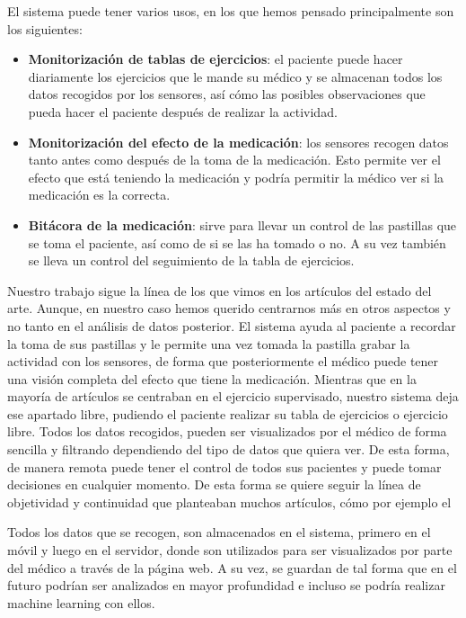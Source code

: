 \documentclass[11pt,spanish]{article}
\begin{document}
El sistema puede tener varios usos, en los que hemos pensado principalmente son los siguientes:

\begin{itemize}
	\item {\bf Monitorización de tablas de ejercicios}: el paciente puede hacer diariamente los ejercicios que le mande su médico y se almacenan todos los datos recogidos por los sensores, así cómo las posibles observaciones que pueda hacer el paciente después de realizar la actividad.
    \item {\bf Monitorización del efecto de la medicación}: los sensores recogen datos tanto antes como después de la toma de la medicación. Esto permite ver el efecto que está teniendo la medicación y podría permitir la médico ver si la medicación es la correcta.
    \item {\bf Bitácora de la medicación}: sirve para llevar un control de las pastillas que se toma el paciente, así como de si se las ha tomado o no. A su vez también se lleva un control del seguimiento de la tabla de ejercicios.
\end{itemize}

Nuestro trabajo sigue la línea de los que vimos en los artículos del estado del arte. Aunque, en nuestro caso hemos querido centrarnos más en otros aspectos y no tanto en el análisis de datos posterior. El sistema ayuda al paciente a recordar la toma de sus pastillas y le permite una vez tomada la pastilla grabar la actividad con los sensores, de forma que posteriormente el médico puede tener una visión completa del efecto que tiene la medicación. Mientras que en la mayoría de artículos se centraban en el ejercicio supervisado, nuestro sistema deja ese apartado libre, pudiendo el paciente realizar su tabla de ejercicios o ejercicio libre. Todos los datos recogidos, pueden ser visualizados por el médico de forma sencilla y filtrando dependiendo del tipo de datos que quiera ver. De esta forma, de manera remota puede tener el control de todos sus pacientes y puede tomar decisiones en cualquier momento. De esta forma se quiere seguir la línea de objetividad y continuidad que planteaban muchos artículos, cómo por ejemplo el \cite{resumen2}
\newline

Todos los datos que se recogen, son almacenados en el sistema, primero en el móvil y luego en el servidor, donde son utilizados para ser visualizados por parte del médico a través de la página web. A su vez, se guardan de tal forma que en el futuro podrían ser analizados en mayor profundidad e incluso se podría realizar machine learning con ellos.
\newline
\end{document}
